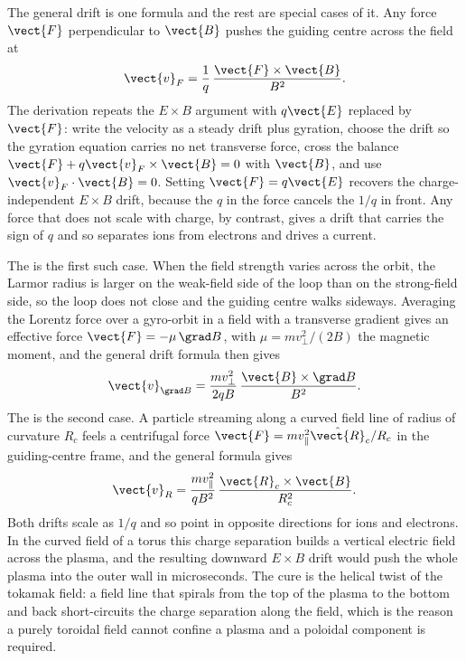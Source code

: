 The general drift is one formula and the rest are special cases of it.
Any force $\vect{F}$ perpendicular to $\vect{B}$ pushes the guiding centre
across the field at
\[
\vect{v}_{F} = \frac{1}{q}\,\frac{\vect{F}\times\vect{B}}{B^{2}}.
\]
The derivation repeats the $E\times B$ argument with $q\vect{E}$ replaced by
$\vect{F}$: write the velocity as a steady drift plus gyration, choose the
drift so the gyration equation carries no net transverse force, cross the
balance $\vect{F} + q\vect{v}_{F}\times\vect{B} = 0$ with $\vect{B}$, and
use $\vect{v}_{F}\cdot\vect{B}=0$. Setting $\vect{F} = q\vect{E}$ recovers
the charge-independent $E\times B$ drift, because the $q$ in the force
cancels the $1/q$ in front. Any force that does not scale with charge, by
contrast, gives a drift that carries the sign of $q$ and so separates ions
from electrons and drives a current.

The  is the first such case. When the field
strength varies across the orbit, the Larmor radius is larger on the
weak-field side of the loop than on the strong-field side, so the loop does
not close and the guiding centre walks sideways. Averaging the Lorentz
force over a gyro-orbit in a field with a transverse gradient gives an
effective force $\vect{F} = -\mu\,\grad B$, with $\mu = mv_{\perp}^{2}/(2B)$
the magnetic moment, and the general drift formula then gives
\[
\vect{v}_{\grad B} = \frac{m v_{\perp}^{2}}{2qB}\,
\frac{\vect{B}\times\grad B}{B^{2}}.
\]
The  is the second case. A particle streaming
along a curved field line of radius of curvature $R_{c}$ feels a
centrifugal force $\vect{F} = m v_{\parallel}^{2}\hat{\vect{R}}_{c}/R_{c}$
in the guiding-centre frame, and the general formula gives
\[
\vect{v}_{R} = \frac{m v_{\parallel}^{2}}{qB^{2}}\,
\frac{\vect{R}_{c}\times\vect{B}}{R_{c}^{2}}.
\]
Both drifts scale as $1/q$ and so point in opposite directions for ions and
electrons. In the curved field of a torus this charge separation builds a
vertical electric field across the plasma, and the resulting downward
$E\times B$ drift would push the whole plasma into the outer wall in
microseconds. The cure is the helical twist of the tokamak field: a field
line that spirals from the top of the plasma to the bottom and back
short-circuits the charge separation along the field, which is the reason a
purely toroidal field cannot confine a plasma and a poloidal component is
required.



